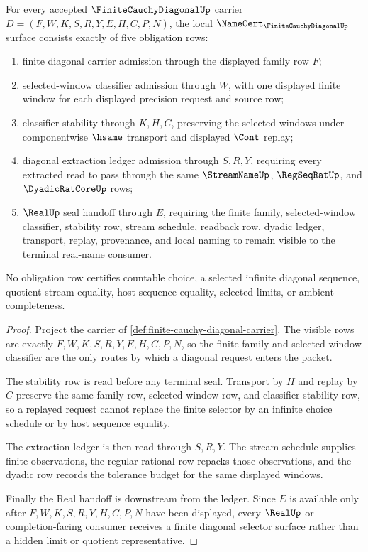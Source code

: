 \begin{theorem}
\label{thm:finite-cauchy-diagonal-namecert-obligations}
For every accepted $\FiniteCauchyDiagonalUp$ carrier $D=(F,W,K,S,R,Y,E,H,C,P,N)$, the local $\NameCert_{\FiniteCauchyDiagonalUp}$ surface consists exactly of five obligation rows:
\begin{enumerate}
\item finite diagonal carrier admission through the displayed family row $F$;
\item selected-window classifier admission through $W$, with one displayed finite window for each displayed precision request and source row;
\item classifier stability through $K,H,C$, preserving the selected windows under componentwise $\hsame$ transport and displayed $\Cont$ replay;
\item diagonal extraction ledger admission through $S,R,Y$, requiring every extracted read to pass through the same $\StreamNameUp$, $\RegSeqRatUp$, and $\DyadicRatCoreUp$ rows;
\item $\RealUp$ seal handoff through $E$, requiring the finite family, selected-window classifier, stability row, stream schedule, readback row, dyadic ledger, transport, replay, provenance, and local naming to remain visible to the terminal real-name consumer.
\end{enumerate}
No obligation row certifies countable choice, a selected infinite diagonal sequence, quotient stream equality, host sequence equality, selected limits, or ambient completeness.
\end{theorem}
\begin{proof}
Project the carrier of \autoref{def:finite-cauchy-diagonal-carrier}. The visible rows are exactly $F,W,K,S,R,Y,E,H,C,P,N$, so the finite family and selected-window classifier are the only routes by which a diagonal request enters the packet.

The stability row is read before any terminal seal. Transport by $H$ and replay by $C$ preserve the same family row, selected-window row, and classifier-stability row, so a replayed request cannot replace the finite selector by an infinite choice schedule or by host sequence equality.

The extraction ledger is then read through $S,R,Y$. The stream schedule supplies finite observations, the regular rational row repacks those observations, and the dyadic row records the tolerance budget for the same displayed windows.

Finally the Real handoff is downstream from the ledger. Since $E$ is available only after $F,W,K,S,R,Y,H,C,P,N$ have been displayed, every $\RealUp$ or completion-facing consumer receives a finite diagonal selector surface rather than a hidden limit or quotient representative.
\end{proof}

